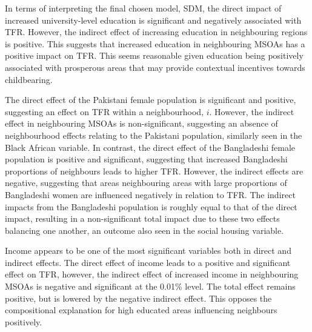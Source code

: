 \documentclass[12pt,twoside]{reedthesis}
\begin{document}
In terms of interpreting the final chosen model, SDM, the direct impact of increased university-level education is significant and negatively associated with TFR. However, the indirect effect of increasing education in neighbouring regions is positive. This suggests that increased education in neighbouring MSOAs has a positive impact on TFR. This seems reasonable given education being positively associated with prosperous areas that may provide contextual incentives towards childbearing.

The direct effect of the Pakistani female population is significant and positive, suggesting an effect on TFR within a neighbourhood, \(i\). However, the indirect effect in neighbouring MSOAs is non-significant, suggesting an absence of neighbourhood effects relating to the Pakistani population, similarly seen in the Black African variable. In contrast, the direct effect of the Bangladeshi female population is positive and significant, suggesting that increased Bangladeshi proportions of neighbours leads to higher TFR. However, the indirect effects are negative, suggesting that areas neighbouring areas with large proportions of Bangladeshi women are influenced negatively in relation to TFR. The indirect impacts from the Bangladeshi population is roughly equal to that of the direct impact, resulting in a non-significant total impact due to these two effects balancing one another, an outcome also seen in the social housing variable.

Income appears to be one of the most significant variables both in direct and indirect effects. The direct effect of income leads to a positive and significant effect on TFR, however, the indirect effect of increased income in neighbouring MSOAs is negative and significant at the 0.01\% level. The total effect remains positive, but is lowered by the negative indirect effect. This opposes the compositional explanation for high educated areas influencing neighbours positively.
\end{document}
